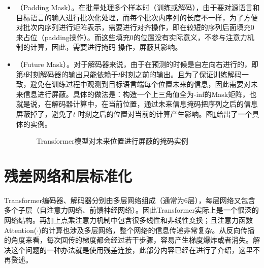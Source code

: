 \begin{itemize}
\vspace{0.5em}
\item {\small{}}（Padding Mask）。在批量处理多个样本时（训练或解码），由于要对源语言和目标语言的输入进行批次化处理，而每个批次内序列的长度不一样，为了方便对批次内序列进行矩阵表示，需要进行对齐操作，即在较短的序列后面填充0来占位（padding操作）。而这些填充0的位置没有实际意义，不参与注意力机制的计算，因此，需要进行掩码 操作，屏蔽其影响。
\vspace{0.5em}
\item {\small{}}（Future Mask）。对于解码器来说，由于在预测的时候是自左向右进行的，即第$t$时刻解码器的输出只能依赖于$t$时刻之前的输出。且为了保证训练解码一致，避免在训练过程中观测到目标语言端每个位置未来的信息，因此需要对未来信息进行屏蔽。具体的做法是：构造一个上三角值全为-inf的Mask矩阵，也就是说，在解码器计算中，在当前位置，通过未来信息掩码把序列之后的信息屏蔽掉了，避免了$t$ 时刻之后的位置对当前的计算产生影响。图\ref{fig:12-13}给出了一个具体的实例。

\begin{figure}[htp]
\centering

\caption{Transformer模型对未来位置进行屏蔽的掩码实例}
\label{fig:12-13}
\end{figure}

\vspace{0.5em}
\end{itemize}


\section{残差网络和层标准化}

\parinterval Transformer编码器、解码器分别由多层网络组成（通常为6层），每层网络又包含多个子层（自注意力网络、前馈神经网络）。因此Transformer实际上是一个很深的网络结构。再加上点乘注意力机制中包含很多线性和非线性变换；且注意力函数Attention($\cdot$)的计算也涉及多层网络，整个网络的信息传递非常复杂。从反向传播的角度来看，每次回传的梯度都会经过若干步骤，容易产生梯度爆炸或者消失。解决这个问题的一种办法就是使用残差连接，此部分内容已经在{\chapternine}进行了介绍，这里不再赘述。

